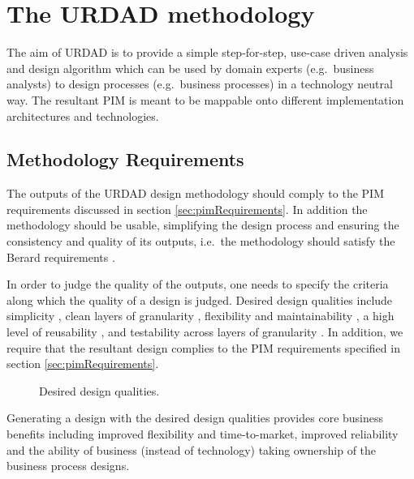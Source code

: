 \section{The URDAD methodology}

The aim of URDAD is to provide a simple step-for-step, use-case driven analysis
and design algorithm which can be used by domain experts (e.g.\ business
analysts) to design processes (e.g.\ business processes) in a technology neutral
way. The resultant PIM is meant to be
mappable onto different implementation architectures and technologies.


\subsection{Methodology Requirements}

The outputs of the URDAD design methodology should comply to the PIM
requirements discussed in section \ref{sec:pimRequirements}. In addition the
methodology should be usable, simplifying the design
process and ensuring the consistency and quality of its outputs,
i.e.\ the methodology should satisfy the Berard requirements
\cite{berard:whatIsMethodology}.

In order to judge the quality of the outputs, one needs to specify the criteria
along which the quality of a design is judged.
Desired design qualities include simplicity
\cite{wirfs-brock:designSimplicity}, clean layers of granularity
\cite{martin:agileSoftwareDevelopment, artus:soaRealization},
flexibility and maintainability
\cite{hordijk:maintainabilityFactors,misra:drivingMaintainableDesign},
a high level of reusability \cite{lenz:softwareReuse}, and
testability across layers of granularity \cite{voas:softwareTestability}. In
addition, we require that the resultant design complies to the PIM
requirements specified in section  \ref{sec:pimRequirements}.

\begin{figure}
  \centering
  \caption{Desired design qualities.}
  \label{fig:designActivities}
\end{figure}

Generating a design with the desired design qualities provides core business
benefits including improved flexibility and time-to-market,
improved reliability and the ability of business (instead of technology)
taking ownership of the business process designs.

